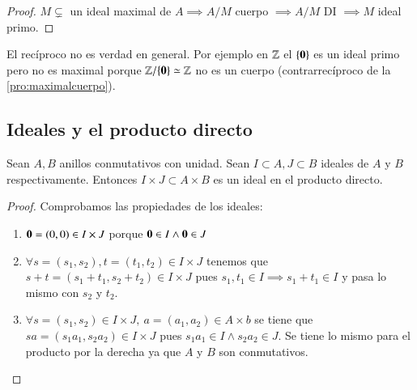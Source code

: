 \begin{proof}
	$M \subsetneq$ un ideal maximal de $A \implies A/M$ cuerpo $\implies A/M$ DI $\implies M$ ideal primo.
\end{proof}

El recíproco no es verdad en general. Por ejemplo en $\mathbb{Z}$ el $\{\mathbf{0}\}$ es un ideal primo pero no es maximal porque $\mathbb{Z}/\{\mathbf{0}\} \simeq \mathbb{Z}$ no es un cuerpo (contrarrecíproco de la \autoref{pro:maximalcuerpo}).

\subsection{Ideales y el producto directo}

\begin{pro}
	Sean $A, B$ anillos conmutativos con unidad. Sean $I \subset A, J \subset B$ ideales de $A$ y $B$ respectivamente. Entonces $I \times J \subset A \times B$ es un ideal en el producto directo.
\end{pro}

\begin{proof}
	Comprobamos las propiedades de los ideales:
	\begin{enumerate}
		\item $\mathbf{0} = (0,0) \in I \times J$ porque $\mathbf{0} \in I \land \mathbf{0} \in J$
		\item $\forall s = (s_1, s_2), t = (t_1, t_2) \in I \times J$ tenemos que $s + t = (s_1 + t_1, s_2 + t_2) \in I \times J$ pues $s_1, t_1 \in I \implies s_1 + t_1 \in I$ y pasa lo mismo con $s_2$ y $t_2$.
		\item $\forall s = (s_1, s_2) \in I \times J,\ a = (a_1, a_2) \in A \times b$ se tiene que $sa = (s_1 a_1, s_2 a_2) \in I \times J$ pues $s_1a_1 \in I \land s_2 a_2 \in J$. Se tiene lo mismo para el producto por la derecha ya que $A$ y $B$ son conmutativos.
	\end{enumerate}
\end{proof}





